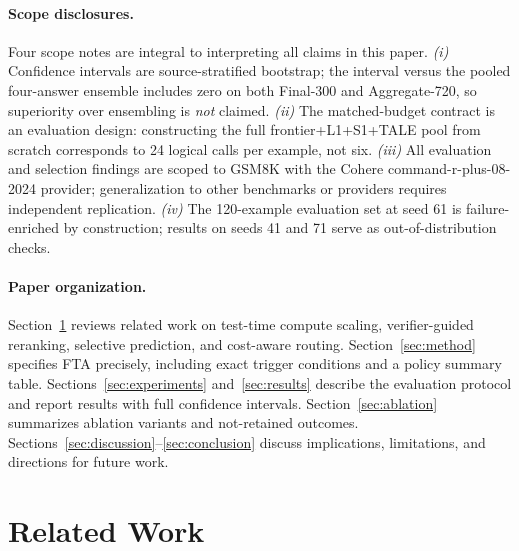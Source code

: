 \documentclass[smallcondensed]{svjour3}
\begin{document}
\paragraph{Scope disclosures.}
Four scope notes are integral to interpreting all claims in this paper.
\emph{(i)} Confidence intervals are source-stratified bootstrap; the interval versus
the pooled four-answer ensemble includes zero on both Final-300 and Aggregate-720,
so superiority over ensembling is \emph{not} claimed.
\emph{(ii)} The matched-budget contract is an evaluation design: constructing the full
frontier+L1+S1+TALE pool from scratch corresponds to 24 logical calls per example,
not six.
\emph{(iii)} All evaluation and selection findings are scoped to GSM8K with the
Cohere command-r-plus-08-2024 provider; generalization to other benchmarks or
providers requires independent replication.
\emph{(iv)} The 120-example evaluation set at seed 61 is failure-enriched by
construction; results on seeds 41 and 71 serve as out-of-distribution checks.

\paragraph{Paper organization.}
Section~\ref{sec:related_work} reviews related work on test-time compute scaling,
verifier-guided reranking, selective prediction, and cost-aware routing.
Section~\ref{sec:method} specifies FTA precisely, including exact trigger conditions
and a policy summary table.
Sections~\ref{sec:experiments} and~\ref{sec:results} describe the evaluation protocol
and report results with full confidence intervals.
Section~\ref{sec:ablation} summarizes ablation variants and not-retained outcomes.
Sections~\ref{sec:discussion}--\ref{sec:conclusion} discuss implications, limitations,
and directions for future work.

\section{Related Work}
\label{sec:related_work}
\end{document}
